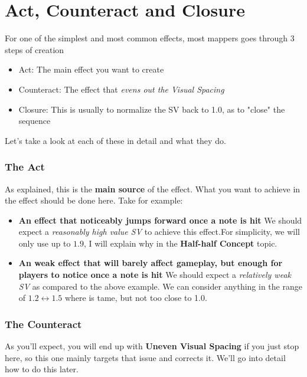 \section{Act, Counteract and Closure}
For one of the simplest and most common effects, most mappers goes through 3 steps of creation
\begin{itemize}
	\item Act: The main effect you want to create
	\item Counteract: The effect that \textit{evens out the Visual Spacing}
	\item Closure: This is usually to normalize the SV back to 1.0, as to "close" the sequence
\end{itemize}
Let's take a look at each of these in detail and what they do.

\subsubsection{The Act}
As explained, this is the \textbf{main source} of the effect. What you want to achieve in the effect should be done here. \newline
Take for example:
\begin{itemize}
	\item \textbf{An effect that noticeably jumps forward once a note is hit} \newline
		  We should expect a \textit{reasonably high value SV} to achieve this effect.\newline For simplicity, we will only use up to $1.9$, I will explain why in the \textbf{Half-half Concept} topic.
	\item \textbf{An weak effect that will barely affect gameplay, but enough for players to notice once a note is hit} \newline
		  We should expect a \textit{relatively weak SV} as compared to the above example. \newline
		  We can consider anything in the range of $1.2 \longleftrightarrow 1.5$ where is tame, but not too close to 1.0.
\end{itemize}

\subsubsection{The Counteract}
As you'll expect, you will end up with \textbf{Uneven Visual Spacing} if you just stop here, so this one mainly targets that issue and corrects it. We'll go into detail how to do this later.

